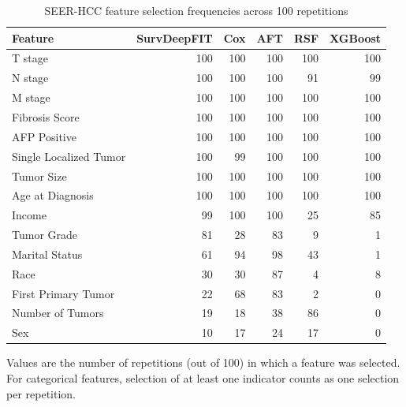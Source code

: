 \begin{table}[!htbp]
\centering
\small
\caption{SEER-HCC feature selection frequencies across 100 repetitions}
\label{tab:seer_heatmap_data}
\begin{tabular}{lrrrrr}
\toprule
Feature & SurvDeepFIT & Cox & AFT & RSF & XGBoost \\
\midrule
T stage & 100 & 100 & 100 & 100 & 100 \\
N stage & 100 & 100 & 100 & 91 & 99 \\
M stage & 100 & 100 & 100 & 100 & 100 \\
Fibrosis Score & 100 & 100 & 100 & 100 & 100 \\
AFP Positive & 100 & 100 & 100 & 100 & 100 \\
Single Localized Tumor & 100 & 99 & 100 & 100 & 100 \\
Tumor Size & 100 & 100 & 100 & 100 & 100 \\
Age at Diagnosis & 100 & 100 & 100 & 100 & 100 \\
Income & 99 & 100 & 100 & 25 & 85 \\
Tumor Grade & 81 & 28 & 83 & 9 & 1 \\
Marital Status & 61 & 94 & 98 & 43 & 1 \\
Race & 30 & 30 & 87 & 4 & 8 \\
First Primary Tumor & 22 & 68 & 83 & 2 & 0 \\
Number of Tumors & 19 & 18 & 38 & 86 & 0 \\
Sex & 10 & 17 & 24 & 17 & 0 \\
\bottomrule
\end{tabular}
\begin{minipage}{0.95\linewidth}
\vspace{0.5em}
\footnotesize Values are the number of repetitions (out of 100) in which a feature was selected. For categorical features, selection of at least one indicator counts as one selection per repetition.
\end{minipage}
\end{table}
